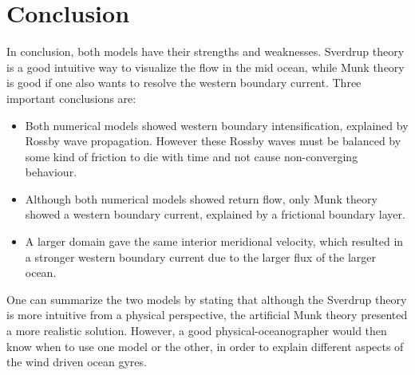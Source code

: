 \section{Conclusion}
In conclusion, both models have their strengths and weaknesses. Sverdrup theory is a good intuitive way to visualize the flow in the mid ocean, while Munk theory is good if one also wants to resolve the western boundary current. Three important conclusions are:
\begin{itemize}
    \item Both numerical models showed western boundary intensification, explained by Rossby wave propagation. However these Rossby waves must be balanced by some kind of friction to die with time and not cause non-converging behaviour.
    \item Although both numerical models showed return flow, only Munk theory showed a western boundary current, explained by a frictional boundary layer.
    \item A larger domain gave the same interior meridional velocity, which resulted in a stronger western boundary current due to the larger flux of the larger ocean.
\end{itemize}
One can summarize the two models by stating that although the Sverdrup theory is more intuitive from a physical perspective, the artificial Munk theory presented a more realistic solution. However, a good physical-oceanographer would then know when to use one model or the other, in order to explain different aspects of the wind driven ocean gyres.